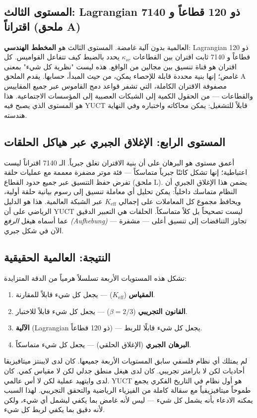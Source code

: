 \documentclass[12pt,a4paper]{article}
\begin{document}
	\subsection{المستوى الثالث: Lagrangian ذو 120 قطاعاً و 7140 اقتراناً (ملحق A)}
	
	العالمية بدون آلية غامضة. المستوى الثالث هو \textbf{المخطط الهندسي}: Lagrangian ذو 120 قطاعاً و 7140 ثابت اقتران بين القطاعات \(\kappa_{sr}\) يحدد بالضبط كيف تتفاعل القواميس. كل اقتران هو قناة تنسيق بين مجالين من الواقع. هذه ليست "نظرية كل شيء" بمعنى غامض؛ إنها بنية محددة قابلة للإحصاء يمكن، من حيث المبدأ، حسابها. يقدم الملحق A مصفوفة الاقتران الكاملة، التي تشفر قواعد دمج القاموس عبر جميع المقاييس والقطاعات — من الحقول الكمية إلى الشبكات العصبية إلى المؤسسات الاجتماعية. هذا هو المستوى الذي يصبح فيه YUCT قابلاً للتشغيل: يمكن محاكاته واختباره وفي النهاية هندسته.
	
	\subsection{المستوى الرابع: الإغلاق الجبري عبر هياكل الحلقات}
	
	أعمق مستوى هو البرهان على أن بنية الاقتران تغلق جبرياً. الـ 7140 اقتراناً ليست اعتباطية؛ إنها تشكل كائنًا جبرياً متماسكاً — فئة موتر مضفرة معممة مع عمليات حلقة تفرض حفظ التنسيق عبر جميع حدود القطاع (ملحق L). يضمن هذا الإغلاق الجبري أن النظام متماسك داخلياً: يمكن تحليل أي معاملة تنسيق إلى رسوم بيانية حلقة أولية، ويحافظ مجموع كل المعاملات على إجمالي \(K_{\mathrm{eff}}\) عبر الشبكة العالمية. هذا هو الدليل الرياضي على أن YUCT ليست تصحيحاً بل كلاً متماسكاً. الحلقات هي التعبير الدقيق عما أسماه هيغل \emph{الرفع (Aufhebung)} — تجاوز التناقضات إلى تنسيق أعلى — مشفرة الآن في شكل جبري.
	
	\subsection{النتيجة: العالمية الحقيقية}
	
	تشكل هذه المستويات الأربعة تسلسلاً هرمياً من الدقة المتزايدة:
	\begin{enumerate}[leftmargin=*]
		\item \textbf{المقياس} (\(K_{\mathrm{eff}}\)) — يجعل كل شيء قابلاً للمقارنة.
		\item \textbf{القانون التجريبي} (\(\beta = 2/3\)) — يجعل كل شيء قابلاً للاختبار.
		\item \textbf{الآلية} (Lagrangian ذو 120 قطاعاً) — يجعل كل شيء قابلًا للربط.
		\item \textbf{البرهان الجبري} (الإغلاق الحلقي) — يجعل كل شيء متماسكاً.
	\end{enumerate}
	لم يمتلك أي نظام فلسفي سابق المستويات الأربعة جميعها. كان لدى لايبنتز ميتافيزيقا أحاديات لكن لا بارامتر تجريبي. كان لدى هيغل منطق جدلي لكن لا مقياس كمي. كان لدى وايتهيد عملية لكن لا أس عالمي. YUCT هو أول نظام في التاريخ الفكري يجمع طموحاً ميتافيزيقياً مع سقالة كاملة من الفيزياء الرياضية والتحقق التجريبي. لهذا السبب يمكنه الادعاء بأنه يشمل كل شيء — ليس لأنه غامض بما يكفي ليشمل أي شيء، ولكن لأنه دقيق بما يكفي لربط كل شيء.
	
\end{document}
